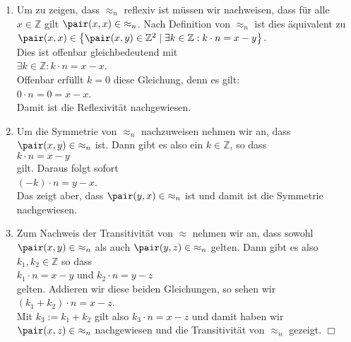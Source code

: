 \begin{enumerate}
\item Um zu zeigen, dass $\approx_n$ reflexiv ist m\"{u}ssen wir nachweisen, dass f\"{u}r alle
      $x \in \mathbb{Z}$ gilt $\pair(x,x) \in\; \approx_n$.  Nach Definition von $\approx_n$
      ist dies \"{a}quivalent zu \\[0.2cm]
      \hspace*{1.3cm}
      $\pair(x,x) \in \bigl\{ \pair(x,y) \in \mathbb{Z}^2 \mid \exists k \in \mathbb{Z}: k \cdot n = x - y \bigr\}$.
      \\[0.2cm]
      Dies ist offenbar gleichbedeutend mit \\[0.2cm]
      \hspace*{1.3cm}
      $\exists k \in \mathbb{Z}: k \cdot n = x - x$.
      \\[0.2cm]
      Offenbar erf\"{u}llt $k=0$ diese Gleichung, denn es gilt: \\[0.2cm]
      \hspace*{1.3cm}
      $0\cdot n = 0 = x - x$. 
      \\[0.2cm]
      Damit ist die Reflexivit\"{a}t nachgewiesen.
\item Um die Symmetrie von $\approx_n$ nachzuweisen nehmen wir an, dass 
      $\pair(x,y) \in\; \approx_n$ ist.  Dann gibt es also ein $k \in \mathbb{Z}$, so dass
      \\[0.2cm]
      \hspace*{1.3cm}      
      $k\cdot n = x - y$
      \\[0.2cm] 
      gilt.  Daraus folgt sofort
      \\[0.2cm]
      \hspace*{1.3cm}      
      $(-k)\cdot n = y - x$.
      \\[0.2cm]
      Das zeigt aber, dass $\pair(y,x) \in\; \approx_n$ ist und damit ist die Symmetrie
      nachgewiesen.
\item Zum Nachweis der Transitivit\"{a}t von $\approx$ nehmen wir an, dass
      sowohl $\pair(x,y) \in\; \approx_n$ als auch $\pair(y,z) \in\; \approx_n$
      gelten.  Dann gibt es also $k_1,k_2 \in \mathbb{Z}$ so dass 
      \\[0.2cm]
      \hspace*{1.3cm}      
      $k_1 \cdot n = x - y$ \quad und \quad $k_2 \cdot n = y - z$ 
      \\[0.2cm]
      gelten.  Addieren wir diese beiden Gleichungen, so sehen wir
      \\[0.2cm]
      \hspace*{1.3cm}      
      $(k_1 + k_2) \cdot n = x - z$.
      \\[0.2cm]
      Mit $k_3 := k_1 + k_2$ gilt also $k_3\cdot n = x - z$ und damit haben wir
      $\pair(x,z) \in\; \approx_n$ nachgewiesen und die Transitivit\"{a}t von $\approx_n$
      gezeigt.  \hspace*{\fill} $\Box$      
\end{enumerate}

